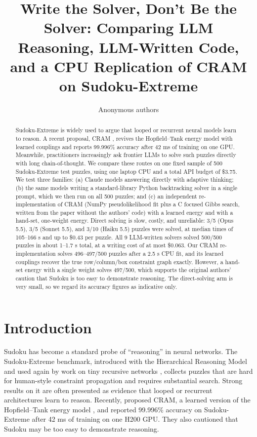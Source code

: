 \documentclass{article} %
\title{Write the Solver, Don't Be the Solver: Comparing LLM Reasoning, LLM-Written Code, and a CPU Replication of CRAM on Sudoku-Extreme}
\author{Anonymous authors}
\begin{document}
\maketitle

\begin{abstract}
Sudoku-Extreme is widely used to argue that looped or recurrent neural models learn to reason. A recent proposal, CRAM \citep{hoover2026cram}, revives the Hopfield--Tank energy model with learned couplings and reports 99.996\% accuracy after 42 ms of training on one GPU. Meanwhile, practitioners increasingly ask frontier LLMs to solve such puzzles directly with long chain-of-thought. We compare these routes on one fixed sample of 500 Sudoku-Extreme test puzzles, using one laptop CPU and a total API budget of \$3.75. We test three families: (a) Claude models answering directly with adaptive thinking; (b) the same models writing a standard-library Python backtracking solver in a single prompt, which we then run on all 500 puzzles; and (c) an independent re-implementation of CRAM (NumPy pseudolikelihood fit plus a C focused Gibbs search, written from the paper without the authors' code) with a learned energy and with a hand-set, one-weight energy. Direct solving is slow, costly, and unreliable: 3/5 (Opus 5.5), 3/5 (Sonnet 5.5), and 3/10 (Haiku 5.5) puzzles were solved, at median times of 105--166 s and up to \$0.43 per puzzle. All 9 LLM-written solvers solved 500/500 puzzles in about 1--1.7 s total, at a writing cost of at most \$0.063. Our CRAM re-implementation solves 496--497/500 puzzles after a 2.5 s CPU fit, and its learned couplings recover the true row/column/box constraint graph exactly. However, a hand-set energy with a single weight solves 497/500, which supports the original authors' caution that Sudoku is too easy to demonstrate reasoning. The direct-solving arm is very small, so we regard its accuracy figures as indicative only.
\end{abstract}

\section{Introduction}
\label{sec:intro}
Sudoku has become a standard probe of ``reasoning'' in neural networks. The Sudoku-Extreme benchmark, introduced with the Hierarchical Reasoning Model \citep{wang2025hrm} and used again by work on tiny recursive networks \citep{jolicoeur2025trm}, collects puzzles that are hard for human-style constraint propagation and requires substantial search. Strong results on it are often presented as evidence that looped or recurrent architectures learn to reason. Recently, \citet{hoover2026cram} proposed CRAM, a learned version of the Hopfield--Tank energy model \citep{hopfield1985neural}, and reported 99.996\% accuracy on Sudoku-Extreme after 42 ms of training on one H200 GPU. They also cautioned that Sudoku may be too easy to demonstrate reasoning.
\end{document}
